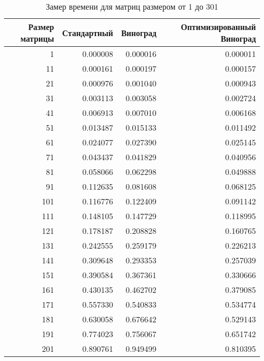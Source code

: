 \begin{table}[ht]
    \small
    \begin{center}
        \begin{threeparttable}
            \caption{Замер времени для матриц размером от 1 до 301}
            \label{tbl:time}
            \begin{tabular}{|r|r|r|r|}
                \hline
                \textbf{Размер матрицы} & \textbf{Стандартный} & \textbf{Виноград} & \textbf{Оптимизированный Виноград} \\
                \hline
                1   & 0.000008  & 0.000016  & 0.000011  \\
                11  & 0.000161  & 0.000197  & 0.000157  \\
                21  & 0.000976  & 0.001040  & 0.000943  \\
                31  & 0.003113  & 0.003058  & 0.002724  \\
                41  & 0.006913  & 0.007010  & 0.006168  \\
                51  & 0.013487  & 0.015133  & 0.011492  \\
                61  & 0.024077  & 0.027390  & 0.025145  \\
                71  & 0.043437  & 0.041829  & 0.040956  \\
                81  & 0.058066  & 0.062298  & 0.049888  \\
                91  & 0.112635  & 0.081608  & 0.068125  \\
                101 & 0.116776  & 0.122409  & 0.091142  \\
                111 & 0.148105  & 0.147729  & 0.118995  \\
                121 & 0.178187  & 0.208828  & 0.160765  \\
                131 & 0.242555  & 0.259179  & 0.226213  \\
                141 & 0.309648  & 0.293353  & 0.257039  \\
                151 & 0.390584  & 0.367361  & 0.330666  \\
                161 & 0.430135  & 0.462702  & 0.379085  \\
                171 & 0.557330  & 0.540833  & 0.534774  \\
                181 & 0.630058  & 0.676642  & 0.529143  \\
                191 & 0.774023  & 0.756067  & 0.651742  \\
                201 & 0.890761  & 0.949499  & 0.810395  \\

\end{tabular}
\end{threeparttable}
\end{center}
\end{table}
